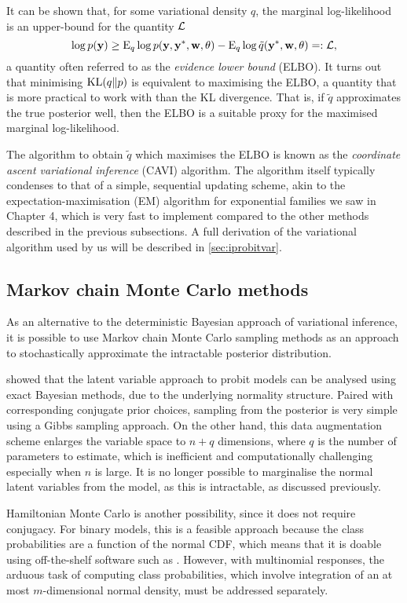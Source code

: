It can be shown that, for some variational density $q$, the marginal log-likelihood is an upper-bound for the quantity ${\mathcal L}$
\[
  \log p({\mathbf y}) \geq 
    \operatorname{E}_{ q} \log p({\mathbf y},{\mathbf y}^*,{\mathbf w},\theta)
    - \operatorname{E}_{ q} \log \tilde q({\mathbf y}^*,{\mathbf w},\theta) =: {\mathcal L},
\]
a quantity often referred to as the \emph{evidence lower bound} (ELBO).
It turns out that minimising $\operatorname{KL}(q\Vert p)$ is equivalent to maximising the ELBO, a quantity that is more practical to work with than the KL divergence.
That is, if $\tilde q$ approximates the true posterior well, then the ELBO is a suitable proxy for the maximised marginal log-likelihood.

The algorithm to obtain $\tilde q$ which maximises the ELBO is known as the \emph{coordinate ascent variational inference} (CAVI) algorithm.
The algorithm itself typically condenses to that of a simple, sequential updating scheme, akin to the expectation-maximisation (EM) algorithm for exponential families we saw in Chapter 4, which is very fast to implement compared to the other methods described in the previous subsections.
A full derivation of the variational algorithm used by us will be described in \cref{sec:iprobitvar}.

\subsection{Markov chain Monte Carlo methods}

As an alternative to the deterministic Bayesian approach of variational inference, it is possible to use Markov chain Monte Carlo sampling methods as an approach to stochastically approximate the intractable posterior distribution.

\citet{albert1993bayesian} showed that the latent variable approach to probit models can be analysed using exact Bayesian methods, due to the underlying normality structure.
Paired with corresponding conjugate prior choices, sampling from the posterior is very simple using a Gibbs sampling approach.
On the other hand, this data augmentation scheme enlarges the variable space to $n+q$ dimensions, where $q$ is the number of parameters to estimate, which is inefficient and computationally challenging especially when $n$ is large.
It is no longer possible to marginalise the normal latent variables from the model, as this is intractable, as discussed previously.

Hamiltonian Monte Carlo is another possibility, since it does not require conjugacy.
For binary models, this is a feasible approach because the class probabilities are a function of the normal CDF, which means that it is doable using off-the-shelf software such as .
However, with multinomial responses, the arduous task of computing class probabilities, which involve integration of an at most $m$-dimensional normal density, must be addressed separately.

